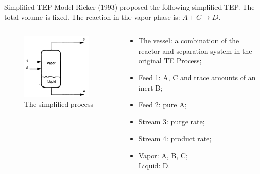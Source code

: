 \documentclass[10pt]{beamer}
\begin{document}
\begin{frame}{Simplified TEP Model}
  Ricker (1993) proposed the following simplified TEP. The total volume is fixed. The reaction in the vapor phase is: $A+C\rightarrow D$.
  \begin{columns}
    \begin{column}{0.45\textwidth}
      \begin{figure}
        \includegraphics[width=0.9\textwidth]{simplifiedmodel.png}
        \caption{The simplified process}
      \end{figure}
    \end{column}
    \begin{column}{0.55\textwidth} 		
      \begin{itemize}
      \item The vessel: a combination of the reactor and separation system in the original TE Process;
      \item Feed 1: A, C and trace amounts of an inert B;
      \item Feed 2: pure A;
      \item Stream 3: purge rate;
      \item Stream 4: product rate;
      \item Vapor: A, B, C;\\
        Liquid: D.
      \end{itemize}
    \end{column}
  \end{columns}
\end{frame}
\end{document}
